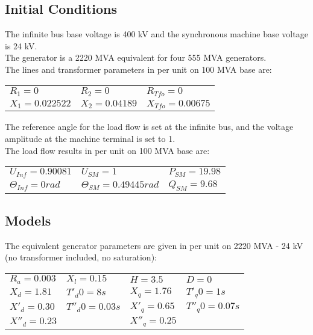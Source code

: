 \documentclass[a4paper, 12pt]{report}
\begin{document}
\subsection{Initial Conditions}

The infinite bus base voltage is 400 kV and the synchronous machine base voltage is 24 kV. \\

The generator is a 2220 MVA equivalent for four 555 MVA generators.\\

The lines and transformer parameters in per unit on 100 MVA base are:
\begin{center}
\begin{tabular}{l|l|l}
   $R_1=0$ & $R_2=0$ & $R_{Tfo}=0$ \\
   $X_1=0.022522$ & $X_2=0.04189$ & $X_{Tfo}=0.00675$ \\
\end{tabular}
\end{center}

The reference angle for the load flow is set at the infinite bus, and the voltage amplitude at the machine terminal is set to 1. \\

The load flow results in per unit on 100 MVA base are:
\begin{center}
\begin{tabular}{l|l|l}
   $U_{Inf}=0.90081$ & $U_{SM}=1$ & $P_{SM}=19.98$ \\
   $\Theta_{Inf}=0rad$ & $\Theta_{SM}=0.49445rad$ & $Q_{SM}=9.68$ \\
\end{tabular}
\end{center}

\subsection{Models}

The equivalent generator parameters are given in per unit on 2220 MVA - 24 kV (no transformer included, no saturation):
\begin{center}
\begin{tabular}{l|l|l|l}
   $R_a=0.003$ & $X_l=0.15$ & $H=3.5$ & $D=0$ \\
   $X_d=1.81$ & $T'_d0=8s$ & $X_q=1.76$ & $T'_q0=1s$ \\
   $X'_d=0.30$ & $T''_d0=0.03s$ & $X'_q=0.65$ & $T''_q0=0.07s$ \\
   $X''_d=0.23$ & & $X''_q=0.25$ &  \\
\end{tabular}
\end{center}
\end{document}
